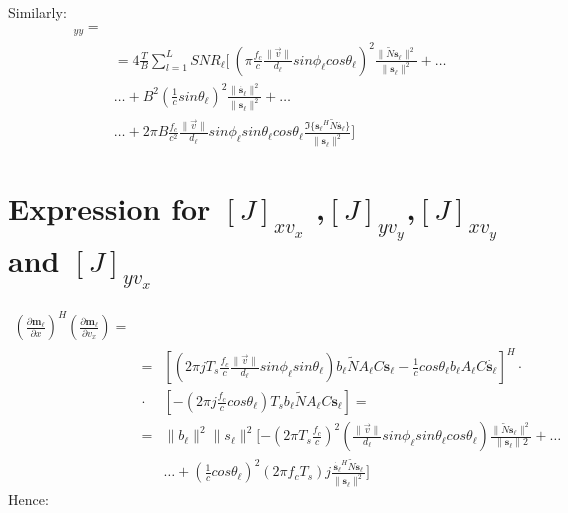 \documentclass[10pt,a4paper]{report}
\begin{document}
Similarly:
\begin{eqnarray}
[J]_{y y} = \\
&= 4\frac{T}{B} \sum_{l=1}^{L}{SNR}_\ell  [\ \left( \pi \frac{f_c}{c}\frac{\|\vec{v}\|}{d_\ell }sin\phi_\ell  cos\theta_\ell  \right)^2 \frac{\|\tilde{N}\mathbf{s_\ell }\|^2}{\|\mathbf{s_\ell }\|^2}+ \dots \nonumber \\
&\dots+ B^2\left( \frac{1}{c} sin\theta_\ell  \right)^2 \frac{\|\mathbf{\dot{s_\ell }}\|^2}{\|\mathbf{s_\ell }\|^2} + \dots \nonumber \\
&\dots + 2 \pi B \frac{f_c}{c^2}\frac{\|\vec{v}\|}{d_\ell }sin\phi_\ell  sin\theta_\ell  cos \theta_\ell  \frac{\Im\{\mathbf{s_\ell }^H\tilde{N}\mathbf{\dot{s_\ell }}\}}{\|\mathbf{s_\ell }\|^2} ] \nonumber
\end{eqnarray}

\section{Expression for $[J]_{x v_x}$ ,$[J]_{y v_y}$,$[J]_{x v_y} $ and $[J]_{y v_x} $}
\begin{eqnarray}
\left(\frac{\partial \mathbf{m_\ell }}{\partial x} \right)^H \left(\frac{\partial \mathbf{m_\ell }}{\partial v_x} \right) = \\
&=&\left[(2 \pi j T_s \frac{f_c}{c} \frac{\|\vec{v}\|}{d_\ell } sin\phi_\ell  sin\theta_\ell )b_\ell  \tilde{N} A_\ell  C \mathbf{s_\ell } -\frac{1}{c}cos\theta_\ell  b_\ell  A_\ell  C \dot{\mathbf{s_\ell }}\right]^H \cdot \nonumber \\
&\cdot& \left[ -(2 \pi j \frac{f_c}{c} cos\theta_\ell ) T_s b_\ell  \tilde{N} A_\ell  C \mathbf{s_\ell } \right] = \nonumber \\
&=& \|b_\ell \|^2\|s_\ell \|^2 [ -\left(2 \pi T_s \frac{f_c}{c}\right)^2\left(\frac{\|\vec{v}\|}{d_\ell } sin \phi_\ell  sin \theta_\ell  cos \theta_\ell \right)\frac{\|\tilde{N}\mathbf{s_\ell }\|^2}{\|\mathbf{s_\ell }\|2} +\dots \nonumber\\
&&\dots +\left(\frac{1}{c}cos \theta_\ell \right)^2(2 \pi f_c T_s)j \frac{\mathbf{\dot{s_\ell }}^H\tilde{N}\mathbf{s_\ell }}{\|\mathbf{s_\ell }\|^2} ]
 \nonumber
\end{eqnarray}
Hence:
\end{document}
